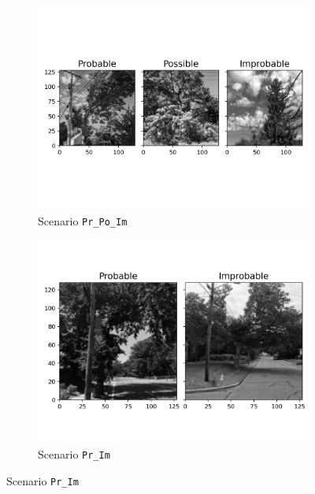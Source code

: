 \documentclass[Journal,letterpaper, SingleSpace, InsideFigs]{ascelike-new}
\begin{document}
\begin{figure}[h!]
  \centering
  \begin{subfigure}[t]{.5\linewidth}
    \centering
    \includegraphics[width=\linewidth]{processed_input_images_Pr_Po_Im_128_px}
    \caption{Scenario \texttt{Pr\_Po\_Im}}
    \label{pr_po_im_64}
  \end{subfigure}%
  \begin{subfigure}[t]{.5\linewidth}
    \centering
    \includegraphics[width=\linewidth]{processed_input_images_Pr_Im_128_px}
    \caption{Scenario \texttt{Pr\_Im}}
    \label{pr_im_64}
  \end{subfigure}%
  

\end{figure}
\end{document}
